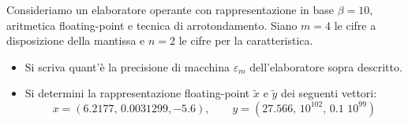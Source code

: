 Consideriamo un elaboratore operante con rappresentazione in base
$\beta=10$, aritmetica floating-point e tecnica di
arrotondamento. Siano  $m=4$ le cifre a disposizione della
mantissa e $n=2$ le cifre per la  caratteristica.

\begin{itemize}
 \item Si scriva
quant'\`{e} la precisione di macchina $\varepsilon_m$
dell'elaboratore sopra descritto.
\item
Si determini la rappresentazione floating-point $\widetilde{x}$ e
$\widetilde{y}$ dei seguenti vettori:
\[ x=(6.2177,\,  0.0031299, -5.6), \quad \quad  y=(27.566, \, 10^{102},\,  0.1\,\,10^{99}) \]
\end{itemize}
